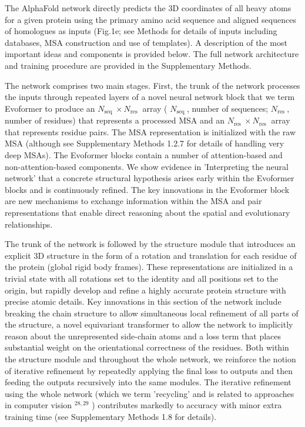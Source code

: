 \documentclass[10pt]{article}
\begin{document}
The AlphaFold network directly predicts the 3D coordinates of all heavy atoms for a given protein using the primary amino acid sequence and aligned sequences of homologues as inputs (Fig.1e; see Methods for details of inputs including databases, MSA construction and use of templates). A description of the most important ideas and components is provided below. The full network architecture and training procedure are provided in the Supplementary Methods.

The network comprises two main stages. First, the trunk of the network processes the inputs through repeated layers of a novel neural network block that we term Evoformer to produce an $N_{\text {seq }} \times N_{\text {res }}$ array ( $N_{\text {seq }}$, number of sequences; $N_{\text {res }}$, number of residues) that represents a processed MSA and an $N_{\text {res }} \times N_{\text {res }}$ array that represents residue pairs. The MSA representation is initialized with the raw MSA (although see Supplementary Methods 1.2.7 for details of handling very deep MSAs). The Evoformer blocks contain a number of attention-based and non-attention-based components. We show evidence in 'Interpreting the neural network' that a concrete structural hypothesis arises early within the Evoformer blocks and is continuously refined. The key innovations in the Evoformer block are new mechanisms to exchange information within the MSA and pair representations that enable direct reasoning about the spatial and evolutionary relationships.

The trunk of the network is followed by the structure module that introduces an explicit 3D structure in the form of a rotation and translation for each residue of the protein (global rigid body frames). These representations are initialized in a trivial state with all rotations set to the identity and all positions set to the origin, but rapidly develop and refine a highly accurate protein structure with precise atomic details. Key innovations in this section of the network include breaking the chain structure to allow simultaneous local refinement of all parts of the structure, a novel equivariant transformer to allow the network to implicitly reason about the unrepresented side-chain atoms and a loss term that places substantial weight on the orientational correctness of the residues. Both within the structure module and throughout the whole network, we reinforce the notion of iterative refinement by repeatedly applying the final loss to outputs and then feeding the outputs recursively into the same modules. The iterative refinement using the whole network (which we term 'recycling' and is related to approaches in computer vision ${ }^{28,29}$ ) contributes markedly to accuracy with minor extra training time (see Supplementary Methods 1.8 for details).
\end{document}
